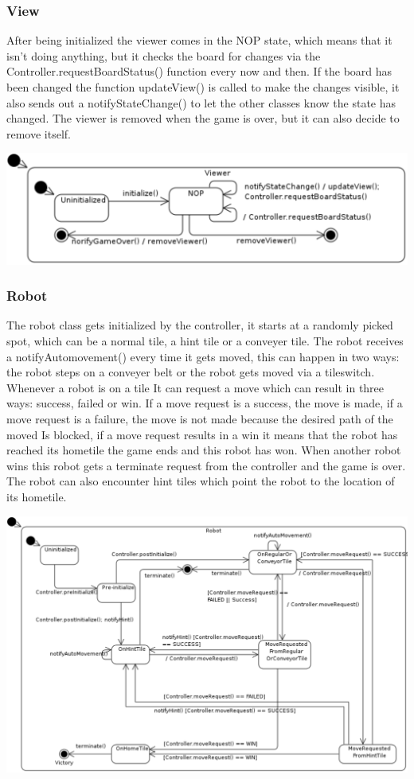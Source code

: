 	\subsubsection{View}
	After being initialized the viewer comes in the NOP state, which means that it isn't doing anything, but it checks the board for changes via the Controller.requestBoardStatus() function every now and then. If the board has been changed the function updateView() is called to make the changes visible, it also sends out a notifyStateChange() to let the other classes know the state has changed. The viewer is removed when the game is over, but it can also decide to remove itself.
	
	\includegraphics[width=\linewidth]{statecharts/view.pdf}

	\subsubsection{Robot}
	The robot class gets initialized by the controller, it starts at a randomly picked spot, which can be a normal tile, a hint tile or a conveyer tile. The robot receives a notifyAutomovement() every time it gets moved, this can happen in two ways: the robot steps on a conveyer belt or the robot gets moved via a tileswitch. Whenever a robot is on a tile It can request a move which can result in three ways: success, failed or win. If a move request is a success, the move is made, if a move request is a failure, the move is not made because the desired path of the moved Is blocked, if a move request results in a win it means that the robot has reached its hometile the game ends and this robot has won. When another robot wins this robot gets a terminate request from the controller and the game is over. The robot can also encounter hint tiles which point the robot to the location of its hometile.
	
	\includegraphics[width=\linewidth]{statecharts/robot.pdf}
	

	
